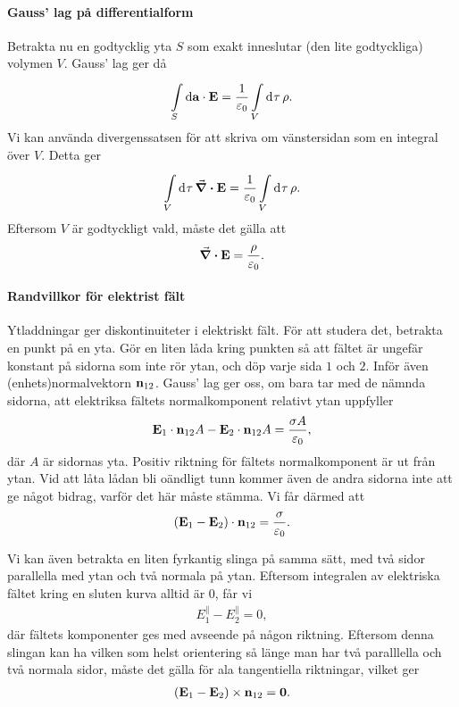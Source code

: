 \paragraph{Gauss' lag på differentialform}
Betrakta nu en godtycklig yta $S$ som exakt inneslutar (den lite godtyckliga) volymen $V$. Gauss' lag ger då
\begin{align*}
	\int\limits_{S}^{}\dd{\vb{a}}\cdot \vb{E} = \frac{1}{\varepsilon_{0}}\int\limits_{V}^{}\dd[]{\tau}\rho.
\end{align*}
Vi kan använda divergenssatsen för att skriva om vänstersidan som en integral över $V$. Detta ger
\begin{align*}
	\int\limits_{V}^{}\dd[]{\tau}\div{\vb{E}} = \frac{1}{\varepsilon_{0}}\int\limits_{V}^{}\dd[]{\tau}\rho.
\end{align*}
Eftersom $V$ är godtyckligt vald, måste det gälla att
\begin{align*}
	\div{\vb{E}} = \frac{\rho}{\varepsilon_{0}}.
\end{align*}

\paragraph{Randvillkor för elektrist fält}
Ytladdningar ger diskontinuiteter i elektriskt fält. För att studera det, betrakta en punkt på en yta. Gör en liten låda kring punkten så att fältet är ungefär konstant på sidorna som inte rör ytan, och döp varje sida $1$ och $2$. Inför även (enhets)normalvektorn $\vb{n}_{12}$. Gauss' lag ger oss, om bara tar med de nämnda sidorna, att elektriksa fältets normalkomponent relativt ytan uppfyller
\begin{align*}
	\vb{E}_{1}\cdot\vb{n}_{12}A - \vb{E}_{2}\cdot\vb{n}_{12}A = \frac{\sigma A}{\varepsilon_{0}},
\end{align*}
där $A$ är sidornas yta. Positiv riktning för fältets normalkomponent är ut från ytan. Vid att låta lådan bli oändligt tunn kommer även de andra sidorna inte att ge något bidrag, varför det här måste stämma. Vi får därmed att
\begin{align*}
	(\vb{E}_{1} - \vb{E}_{2})\cdot\vb{n}_{12} = \frac{\sigma}{\varepsilon_{0}}.
\end{align*}

Vi kan även betrakta en liten fyrkantig slinga på samma sätt, med två sidor parallella med ytan och två normala på ytan. Eftersom integralen av elektriska fältet kring en sluten kurva alltid är $0$, får vi
\begin{align*}
	E_{1}^{\parallel} - E_{2}^{\parallel} = 0,
\end{align*}
där fältets komponenter ges med avseende på någon riktning. Eftersom denna slingan kan ha vilken som helst orientering så länge man har två paralllella och två normala sidor, måste det gälla för ala tangentiella riktningar, vilket ger
\begin{align*}
	(\vb{E}_{1} - \vb{E}_{2})\times\vb{n}_{12} = \vb{0}.
\end{align*}

